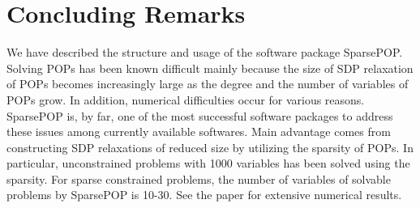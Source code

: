 \section{Concluding Remarks}
\label{remarks}

We have described the structure and usage of the software package SparsePOP.
Solving POPs has been known  difficult mainly because the size of SDP relaxation
of POPs becomes increasingly large as the degree and the number of variables
of POPs grow. In addition, numerical difficulties occur for various reasons.
SparsePOP is, by far, one of the most successful software packages to address
these issues among currently available softwares. 
Main advantage comes from constructing SDP relaxations of reduced size
by utilizing the sparsity of POPs. 
In particular, unconstrained problems with 1000 variables has been solved using
the  sparsity. For sparse constrained problems, the number of variables of solvable problems by SparsePOP is 10-30. 
See the paper \cite{WAKI04} for extensive numerical results. 
